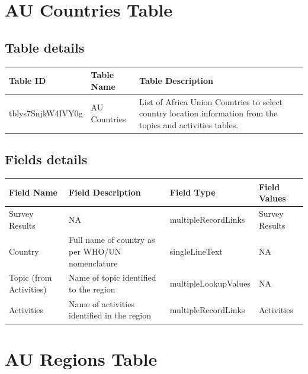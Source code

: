 \documentclass[
]{book}
\begin{document}
\hypertarget{au-countries-table}{%
\section{AU Countries Table}\label{au-countries-table}}

\hypertarget{table-details-1}{%
\subsection{Table details}\label{table-details-1}}

\begin{table}
\centering
\begin{tabular}{l|l|l}
\hline
\textbf{Table ID} & \textbf{Table Name} & \textbf{Table Description}\\
\hline
tblys7SnjkW4IVY0g & AU Countries & List of Africa Union Countries to select country location information from the topics and activities tables.\\
\hline
\end{tabular}
\end{table}

\hypertarget{fields-details-1}{%
\subsection{Fields details}\label{fields-details-1}}

\begin{table}
\centering
\begin{tabular}{l|l|l|l}
\hline
\textbf{Field Name} & \textbf{Field Description} & \textbf{Field Type} & \textbf{Field Values}\\
\hline
Survey Results & NA & multipleRecordLinks & Survey Results\\
\hline
Country & Full name of country as per WHO/UN nomenclature & singleLineText & NA\\
\hline
Topic (from Activities) & Name of topic identified to the region & multipleLookupValues & NA\\
\hline
Activities & Name of activities identified in the region & multipleRecordLinks & Activities\\
\hline
\end{tabular}
\end{table}

\hypertarget{au-regions-table}{%
\section{AU Regions Table}\label{au-regions-table}}
\end{document}
